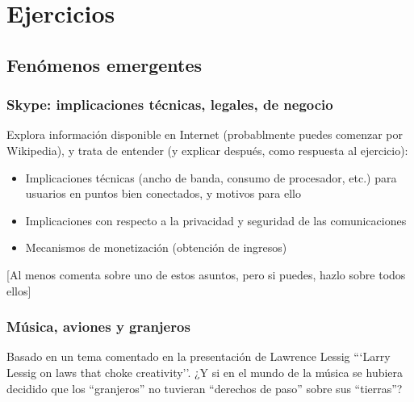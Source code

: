 \documentclass[a4paper,12pt]{article}
\begin{document}
\section{Ejercicios}
\label{sec:ejercicios}

\subsection{Fenómenos emergentes}

\subsubsection{Skype: implicaciones técnicas, legales, de negocio}
\label{sub:skype-implicaciones}

Explora información disponible en Internet (probablmente puedes comenzar por Wikipedia), y trata de entender (y explicar después, como respuesta al ejercicio):

\begin{itemize}
\item Implicaciones técnicas (ancho de banda, consumo de procesador, etc.) para usuarios en puntos bien conectados, y motivos para ello
\item Implicaciones con respecto a la privacidad y seguridad de las comunicaciones
\item Mecanismos de monetización (obtención de ingresos)
\end{itemize}

[Al menos comenta sobre uno de estos asuntos, pero si puedes, hazlo sobre todos ellos]


\subsubsection{Música, aviones y granjeros}
\label{sub:musica-aviones}

Basado en un tema comentado en la presentación de Lawrence Lessig ```Larry Lessig on laws that choke creativity''. ¿Y si en el mundo de la música se hubiera decidido que los ``granjeros'' no tuvieran ``derechos de paso'' sobre sus ``tierras''?
\end{document}
